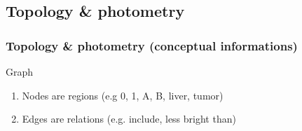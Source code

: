 	\subsection[Topology \& photometry]{Topology \& photometry}
	\begin{frame}
		\frametitle{Topology \& photometry (conceptual informations)}
		\begin{block}{Graph}
			\begin{enumerate}
				\item Nodes are regions (e.g 0, 1, A, B, liver, tumor)
				\item Edges are relations (e.g. include, less bright than)
			\end{enumerate}					
		\end{block}
		\begin{columns}[c]
			\column{10em}		
				\begin{center}
					\\
				\end{center}	


\end{columns}
\end{frame}
